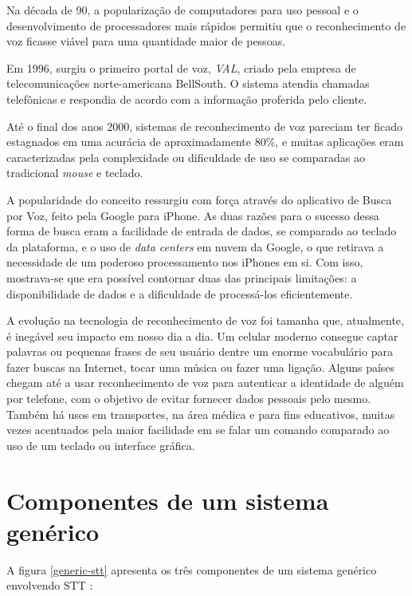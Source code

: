 Na década de 90, a popularização de computadores para uso pessoal e o desenvolvimento de processadores mais rápidos permitiu que o reconhecimento de voz ficasse viável para uma quantidade maior de pessoas.

Em 1996, surgiu o primeiro portal de voz, \emph{VAL}, criado pela empresa de telecomunicações norte-americana BellSouth. O sistema atendia chamadas telefônicas e respondia de acordo com a informação proferida pelo cliente.

Até o final dos anos 2000, sistemas de reconhecimento de voz pareciam ter ficado estagnados em uma acurácia de aproximadamente 80\%, e muitas aplicações eram caracterizadas pela complexidade ou dificuldade de uso se comparadas ao tradicional \textit{mouse} e teclado.

A popularidade do conceito ressurgiu com força através do aplicativo de Busca por Voz, feito pela Google para iPhone. As duas razões para o sucesso dessa forma de busca eram a facilidade de entrada de dados, se comparado ao teclado da plataforma, e o uso de \textit{data centers} em nuvem da Google, o que retirava a necessidade de um poderoso processamento nos iPhones em si. Com isso, mostrava-se que era possível contornar duas das principais limitações: a disponibilidade de dados e a dificuldade de processá-los eficientemente.

A evolução na tecnologia de reconhecimento de voz foi tamanha que, atualmente, é inegável seu impacto em nosso dia a dia. Um celular moderno consegue captar palavras ou pequenas frases de seu usuário dentre um enorme vocabulário para fazer buscas na Internet, tocar uma música ou fazer uma ligação. Alguns países chegam até a usar reconhecimento de voz para autenticar a identidade de alguém por telefone, com o objetivo de evitar fornecer dados pessoais pelo mesmo. Também há usos em transportes, na área médica e para fins educativos, muitas vezes acentuados pela maior facilidade em se falar um comando comparado ao uso de um teclado ou interface gráfica.


\section{Componentes de um sistema genérico}
\label{sttComponents}

A figura \ref{generic-stt} apresenta os três componentes de um sistema genérico envolvendo STT \citep{sttComponentsParameters}:

